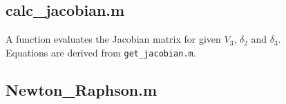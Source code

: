 \documentclass{article}
\begin{document}
\subsection*{calc\_jacobian.m}
A function evaluates the Jacobian matrix for given $V_3$, $\delta_2$ and $\delta_3$.\\
Equations are derived from \texttt{get\_jacobian.m}.


\newpage
\subsection*{Newton\_Raphson.m}


\end{document}
